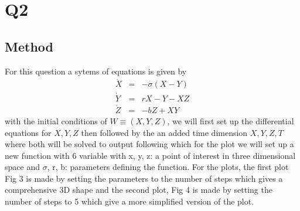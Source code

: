 \documentclass{article}
\begin{document}
\section{Q2}
\subsection{Method}
For this question a sytems of equations is given by\\
\begin{eqnarray}
\dot X &=& -\sigma(X-Y)\\
\dot Y &=& rX -Y - XZ\\
\dot Z &=& -bZ + XY
\end{eqnarray}
with the initial conditions of $W\equiv(X, Y, Z)$, we will first set up the differential equations for $X,Y,Z$ then followed by the an added time dimension $X,Y,Z,T$ where both will be solved to output following which for the plot we will set up a new function with 6 variable with x, y, z: a point of interest in three dimensional space and $\sigma$, r, b: parameters defining the function. For the plots, the first plot Fig 3 is made by setting the parameters to the number of steps which gives a comprehensive 3D shape and the second plot, Fig 4 is made by setting the number of steps to 5 which give a more simplified version of the plot.
\end{document}
